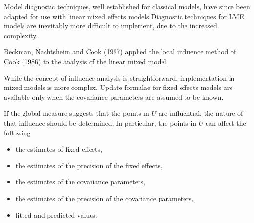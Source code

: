 \documentclass[00-MASTER.tex]{subfiles}
\begin{document}
Model diagnostic techniques, well established for classical models, have since been adapted for use with linear mixed effects models.Diagnostic techniques for LME models are inevitably more difficult to implement, due to the increased complexity.

Beckman, Nachtsheim and Cook (1987) \citet{Beckman} applied the local influence method of Cook (1986) to the analysis of the linear mixed model.

While the concept of influence analysis is straightforward, implementation in mixed models is more complex. Update formulae for fixed effects models are available only when the covariance parameters are assumed to be known.

If the global measure suggests that the points in $U$ are influential, the nature of that influence should be determined. In particular, the points in $U$ can affect the following

\begin{itemize}
	\item the estimates of fixed effects,
	\item the estimates of the precision of the fixed effects,
	\item the estimates of the covariance parameters,
	\item the estimates of the precision of the covariance parameters,
	\item fitted and predicted values.
\end{itemize}




	
\end{document}
